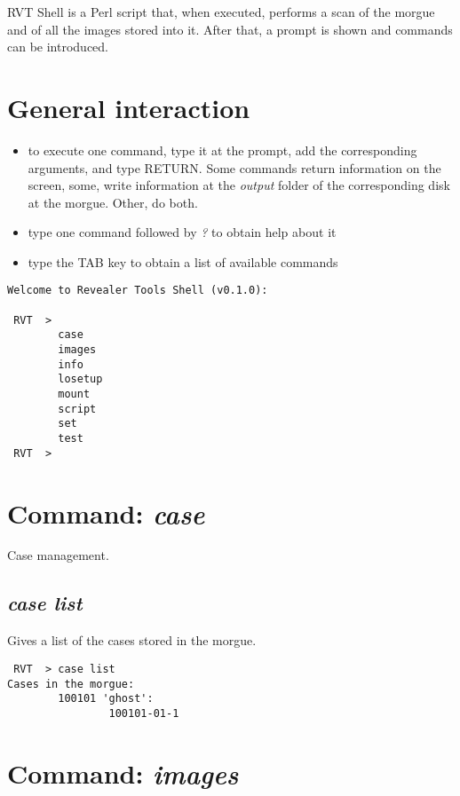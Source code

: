 \documentclass[a4paper,11pt,oneside]{report}
\begin{document}
RVT Shell is a Perl script that, when executed, performs a scan of the morgue and of all the images stored into it. After that, a prompt is shown and commands can be introduced.



\section{General interaction}

\begin{itemize}
\item to execute one command, type it at the prompt, add the corresponding arguments, and type RETURN. Some commands return information on the screen, some, write information at the \emph{output} folder of the corresponding disk at the morgue. Other, do both.

\item type one command followed by \emph{?} to obtain help about it

\item type the TAB key to obtain a list of available commands

\end{itemize}

\begin{verbatim}
Welcome to Revealer Tools Shell (v0.1.0):

 RVT  > 
        case
        images
        info
        losetup
        mount
        script
        set
        test
 RVT  > 
\end{verbatim}


\section{Command: \emph{case}}

Case management.

\subsection*{\emph{case list}}

Gives a list of the cases stored in the morgue.

\begin{verbatim}
 RVT  > case list
Cases in the morgue: 
        100101 'ghost':
                100101-01-1

 \end{verbatim}



\section{Command: \emph{images}}
\end{document}
